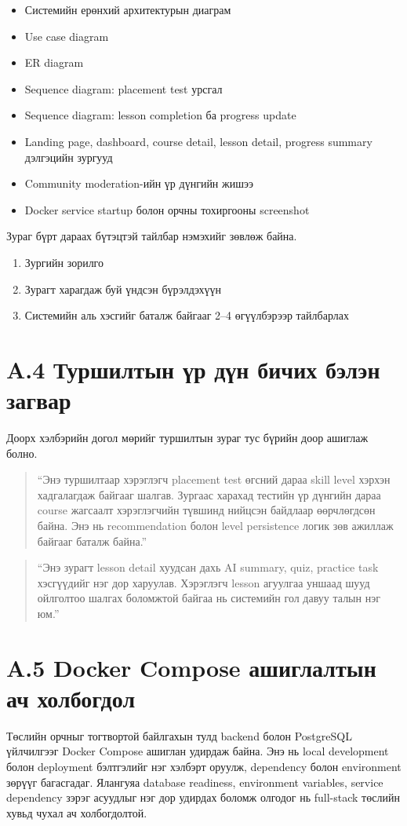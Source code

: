 \begin{itemize}
\item Системийн ерөнхий архитектурын диаграм
\item Use case diagram
\item ER diagram
\item Sequence diagram: placement test урсгал
\item Sequence diagram: lesson completion ба progress update
\item Landing page, dashboard, course detail, lesson detail, progress summary дэлгэцийн зургууд
\item Community moderation-ийн үр дүнгийн жишээ
\item Docker service startup болон орчны тохиргооны screenshot
\end{itemize}

Зураг бүрт дараах бүтэцтэй тайлбар нэмэхийг зөвлөж байна.
\begin{enumerate}
\item Зургийн зорилго
\item Зурагт харагдаж буй үндсэн бүрэлдэхүүн
\item Системийн аль хэсгийг баталж байгааг 2--4 өгүүлбэрээр тайлбарлах
\end{enumerate}

\section*{A.4 Туршилтын үр дүн бичих бэлэн загвар}
Доорх хэлбэрийн догол мөрийг туршилтын зураг тус бүрийн доор ашиглаж болно.

\begin{quote}
``Энэ туршилтаар хэрэглэгч placement test өгсний дараа skill level хэрхэн хадгалагдаж байгааг шалгав. Зургаас харахад тестийн үр дүнгийн дараа course жагсаалт хэрэглэгчийн түвшинд нийцсэн байдлаар өөрчлөгдсөн байна. Энэ нь recommendation болон level persistence логик зөв ажиллаж байгааг баталж байна.''
\end{quote}

\begin{quote}
``Энэ зурагт lesson detail хуудсан дахь AI summary, quiz, practice task хэсгүүдийг нэг дор харуулав. Хэрэглэгч lesson агуулгаа уншаад шууд ойлголтоо шалгах боломжтой байгаа нь системийн гол давуу талын нэг юм.''
\end{quote}

\section*{A.5 Docker Compose ашиглалтын ач холбогдол}
Төслийн орчныг тогтвортой байлгахын тулд backend болон PostgreSQL үйлчилгээг Docker Compose ашиглан удирдаж байна. Энэ нь local development болон deployment бэлтгэлийг нэг хэлбэрт оруулж, dependency болон environment зөрүүг багасгадаг. Ялангуяа database readiness, environment variables, service dependency зэрэг асуудлыг нэг дор удирдах боломж олгодог нь full-stack төслийн хувьд чухал ач холбогдолтой.

